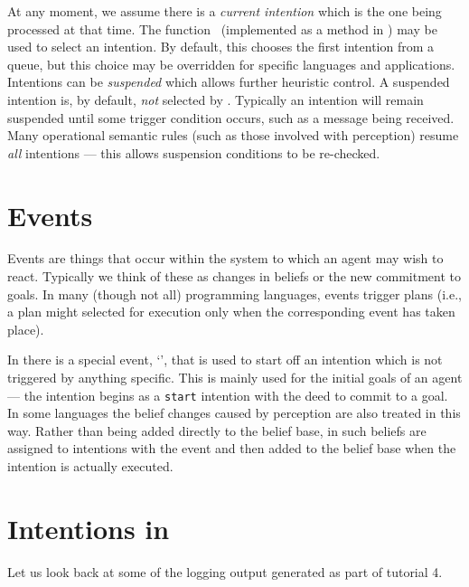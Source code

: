 At any moment, we assume there is a \emph{current intention} which is
the one being processed at that time.  The function
\AILselectintention\ (implemented as a method in \ail) may be used
to select an intention.  By default, this chooses the first intention
from a queue, but this choice may be overridden for specific languages
and applications.  Intentions can be
\emph{suspended} which allows further
heuristic control.  A suspended intention is, by default, \emph{not}
selected by \AILselectintention.  Typically an intention will remain
suspended until some trigger condition occurs, such as a message being
received.  Many operational semantic rules (such as those involved
with perception) resume \emph{all}
intentions --- this allows suspension conditions to be re-checked.

\section{Events}

Events are things that occur within the system to which an agent may
wish to react.  Typically we think of these as changes in
beliefs or the new commitment to
goals.  In many (though not all) programming
languages, events trigger plans (i.e., a plan might selected for
execution only when the corresponding event has taken place).

In \ail{} there is a special event, `\AILstart{}', that is used to
start off an intention which is not triggered by anything specific.
This is mainly used for the initial goals of an agent --- the
intention begins as a \texttt{start} intention with the deed to commit
to a goal.  In some languages the belief changes
caused by perception are also treated in this way.  Rather than being
added directly to the belief base, in \ail{} such beliefs are assigned
to intentions with the event \AILstart{} and then added to the belief
base when the intention is actually executed.

\section{Intentions in \gwendolen}

Let us look back at some of the logging output generated as part of tutorial 4.

